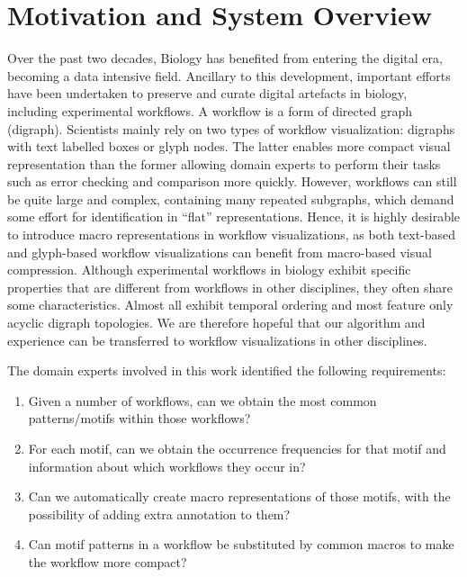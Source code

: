 \section{Motivation and System Overview}
\label{sec:Motivation}

Over the past two decades, Biology has benefited from entering the digital era, becoming a data intensive field.
Ancillary to this development, important efforts have been undertaken to preserve and curate digital artefacts in biology, including experimental workflows.
A workflow is a form of directed graph (digraph).
Scientists mainly rely on two types of workflow visualization: digraphs with text labelled boxes or glyph nodes.
The latter enables more compact visual representation than the former \cite{Maguire:2012:TVCG} allowing domain experts to perform their tasks such as error checking and comparison more quickly.
However, workflows can still be quite large and complex, containing many repeated subgraphs, which demand some effort for identification in ``flat'' representations.  
Hence, it is highly desirable to introduce macro representations in workflow visualizations, as both text-based and glyph-based workflow visualizations can benefit from macro-based visual compression.
Although experimental workflows in biology exhibit specific properties that are different from workflows in other disciplines, they often share some characteristics.
Almost all exhibit temporal ordering and most feature only acyclic digraph topologies.
We are therefore hopeful that our algorithm and experience can be transferred to workflow visualizations in other disciplines.

The domain experts involved in this work identified the following requirements: 

\vspace{-2mm}
\begin{enumerate}[itemsep=-1mm]
\item Given a number of workflows, can we obtain the most common patterns/motifs within those workflows?
\item For each motif, can we obtain the occurrence frequencies for that motif and information about which workflows they occur in?
\item Can we automatically create macro representations of those motifs, with the possibility of adding extra annotation to them?
\item Can motif patterns in a workflow be substituted by common macros to make the workflow more compact?
\end{enumerate}

